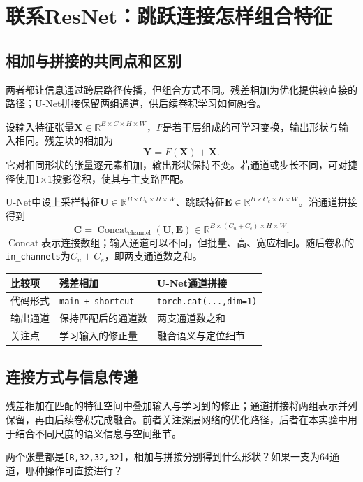 \documentclass[UTF8,a4paper,11pt,fontset=fandol]{ctexart}
\newcommand{\file}[1]{\nolinkurl{#1}}
\newcommand{\shape}[1]{\texttt{#1}}
\begin{document}
\section{联系ResNet：跳跃连接怎样组合特征}
\subsection{相加与拼接的共同点和区别}
两者都让信息通过跨层路径传播，但组合方式不同。残差相加为优化提供较直接的路径；U-Net拼接保留两组通道，供后续卷积学习如何融合。

设输入特征张量$\mathbf X\in\mathbb R^{B\times C\times H\times W}$，$F$是若干层组成的可学习变换，输出形状与输入相同。残差块的相加为
\begin{equation}
\mathbf Y=F(\mathbf X)+\mathbf X.
\end{equation}
它对相同形状的张量逐元素相加，输出形状保持不变。若通道或步长不同，可对捷径使用1$\times$1投影卷积，使其与主支路匹配。

U-Net中设上采样特征$\mathbf U\in\mathbb R^{B\times C_u\times H\times W}$、跳跃特征$\mathbf E\in\mathbb R^{B\times C_e\times H\times W}$。沿通道拼接得到
\begin{equation}
\mathbf C=\operatorname{Concat}_{\mathrm{channel}}(\mathbf U,\mathbf E)
\in\mathbb R^{B\times(C_u+C_e)\times H\times W}.
\end{equation}
$\operatorname{Concat}$表示连接数组；输入通道可以不同，但批量、高、宽应相同。随后卷积的\file{in_channels}为$C_u+C_e$，即两支通道数之和。
\par\noindent\begin{tabularx}{\linewidth}{L{2.6cm}YY}\toprule
比较项 & 残差相加 & U-Net通道拼接\\\midrule
代码形式 & \file{main + shortcut} & \file{torch.cat(...,dim=1)}\\
输出通道 & 保持匹配后的通道数 & 两支通道数之和\\
关注点 & 学习输入的修正量 & 融合语义与定位细节\\\bottomrule
\end{tabularx}\par
\subsection{连接方式与信息传递}
残差相加在匹配的特征空间中叠加输入与学习到的修正；通道拼接将两组表示并列保留，再由后续卷积完成融合。前者关注深层网络的优化路径，后者在本实验中用于结合不同尺度的语义信息与空间细节。
\begin{questionbox}[检查点]
两个张量都是\shape{[B,32,32,32]}，相加与拼接分别得到什么形状？如果一支为64通道，哪种操作可直接进行？
\end{questionbox}
\clearpage
\end{document}
